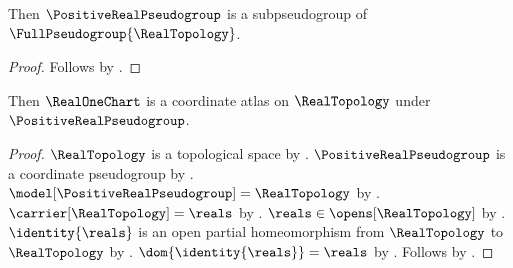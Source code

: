 




\begin{theorem}\label{positive_instance_import_probe}
    Then $\PositiveRealPseudogroup$ is a subpseudogroup of $\FullPseudogroup{\RealTopology}$.
\end{theorem}
\begin{proof}
    Follows by .
\end{proof}

\begin{theorem}\label{positive_atlas_import_probe}
    Then $\RealOneChart$ is a coordinate atlas on $\RealTopology$ under $\PositiveRealPseudogroup$.
\end{theorem}
\begin{proof}
    $\RealTopology$ is a topological space by .
    $\PositiveRealPseudogroup$ is a coordinate pseudogroup by .
    $\model[\PositiveRealPseudogroup]=\RealTopology$ by
        .
    $\carrier[\RealTopology]=\reals$ by .
    $\reals\in\opens[\RealTopology]$ by .
    $\identity{\reals}$ is an open partial homeomorphism from $\RealTopology$ to
        $\RealTopology$ by .
    $\dom{\identity{\reals}}=\reals$ by .
    Follows by .
\end{proof}
